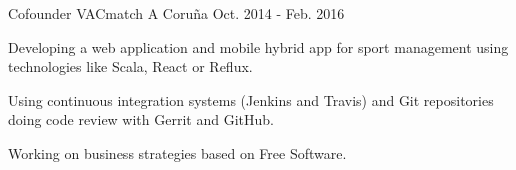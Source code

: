 \begin{cventries}
\cventry
{Cofounder} %
{VACmatch} %
{A Coruña} %
{Oct. 2014 - Feb. 2016} %
{ %
\begin{cvitems}
\item {Developing a web application and mobile hybrid app for sport management 
using technologies like Scala, React or Reflux.}
\item {Using continuous integration systems (Jenkins and Travis) and Git 
repositories doing code review with Gerrit and GitHub.}
\item {Working on business strategies based on Free Software.}
\end{cvitems}
}



\end{cventries}

